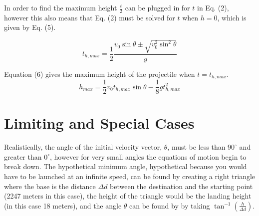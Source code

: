 \documentclass[11pt, oneside]{article}   	%
\begin{document}
\noindent In order to find the maximum height $\frac{t}{2}$ can be plugged in for $t$ in Eq. (2), however this also means that Eq. (2) must be solved for $t$ when $h = 0$, which is given by Eq. (5).

\begin{equation}
t_{h,max} = \frac{1}{2} \frac{v_{0}\sin\theta\pm\sqrt{v_{0}^2\sin^2\theta}}{g}
\end{equation}

\noindent Equation (6) gives the maximum height of the projectile when $t = t_{h,max}$.
\begin{equation}
h_{max} = \frac{1}{2}v_{0}t_{h,max}\sin\theta-\frac{1}{8}gt_{h,max}^2
\end{equation}

%



%
%
%

\section{Limiting and Special Cases}

Realistically, the angle of the initial velocity vector, $\theta$, must be less than $90^{\circ}$ and greater than $0^{\circ}$, however for very small angles the equations of motion begin to break down. The hypothetical minimum angle, hypothetical because you would have to be launched at an infinite speed, can be found by creating a right triangle where the base is the distance $\Delta d$ between the destination and the starting point (2247 meters in this case), the height of the triangle would be the landing height (in this case 18 meters), and the angle $\theta$ can be found by by taking $\tan^{-1}(\frac{h}{\Delta d})$.
\end{document}
